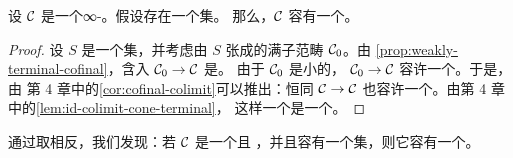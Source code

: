 \begin{corollary}\label{cor:weakly-terminal-terminal-object}
设 $\mathcal{C}$ 是一个\trCocomplete{}\trLocallySmall{}∞-\trCategory{}。假设存在一个\trWeaklyTerminal{}集。
那么，$\mathcal{C}$ 容有一个\trTerminalObject{}。
\end{corollary}

\begin{proof}
设 $S$ 是一个\trWeaklyTerminal{}集，并考虑由 $S$ 张成的满子范畴 $\mathcal{C}_0$。由%
\cref{prop:weakly-terminal-cofinal}，含入 $\mathcal{C}_0 \to \mathcal{C}$ 是\trCofinal{}。
由于 $\mathcal{C}_0$ 是小的，\trFunctor{} $\mathcal{C}_0 \to \mathcal{C}$ 容许一个\trColimit{}。于是，由
第 4 章中的\cref{cor:cofinal-colimit}可以推出：恒同\trFunctor{} $\mathcal{C} \to \mathcal{C}$
也容许一个\trColimit{}。由第 4 章中的\cref{lem:id-colimit-cone-terminal}，
这样一个\trColimit{}是一个\trTerminalObject{}。
\end{proof}

\begin{remark}\label{rem:weakly-initial-initial-object}
通过取相反\trCategories{}，我们发现：若 $\mathcal{C}$ 是一个\trLocallySmall{}且\trComplete{}%
\trCategory{}，并且容有一个\trWeaklyInitial{}集，则它容有一个\trInitialObject{}。
\end{remark}


